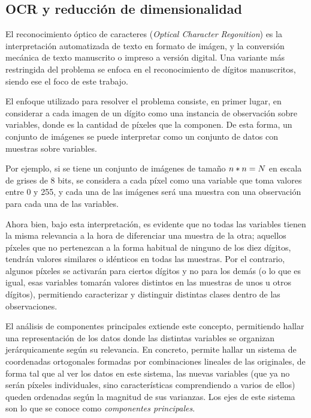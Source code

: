 \subsection{OCR y reducción de dimensionalidad}
\label{intro:ocr}

El reconocimiento óptico de caracteres (\emph{Optical Character Regonition}) es la interpretación automatizada de texto en formato de imágen, y la conversión mecánica de texto manuscrito o impreso a versión digital. Una variante más restringida del problema se enfoca en el reconocimiento de dígitos manuscritos, siendo ese el foco de este trabajo.

El enfoque utilizado para resolver el problema consiste, en primer lugar, en considerar a cada imagen de un dígito como una instancia de observación sobre \N variables, donde \N es la cantidad de píxeles que la componen. De esta forma, un conjunto de \M imágenes se puede interpretar como un conjunto de datos con \M muestras sobre \N variables.

Por ejemplo, si se tiene un conjunto de imágenes de tamaño $n * n = N$ en escala de grises de 8 bits, se considera a cada píxel como una variable que toma valores entre 0 y 255, y cada una de las imágenes será una muestra con una observación para cada una de las \N variables.

Ahora bien, bajo esta interpretación, es evidente que no todas las variables tienen la misma relevancia a la hora de diferenciar una muestra de la otra; aquellos píxeles que no pertenezcan a la forma habitual de ninguno de los diez dígitos, tendrán valores similares o idénticos en todas las muestras. Por el contrario, algunos píxeles se activarán para ciertos dígitos y no para los demás (o lo que es igual, esas variables tomarán valores distintos en las muestras de unos u otros  dígitos), permitiendo caracterizar y distinguir distintas clases dentro de las observaciones.

El análisis de componentes principales extiende este concepto, permitiendo hallar una representación de los datos donde las distintas variables se organizan jerárquicamente según su relevancia. En concreto, permite hallar un sistema de coordenadas ortogonales formadas por combinaciones lineales de las originales, de forma tal que al ver los datos en este sistema, las nuevas variables (que ya no serán píxeles individuales, sino características comprendiendo a varios de ellos) queden ordenadas según la magnitud de sus varianzas. Los ejes de este sistema son lo que se conoce como \emph{componentes principales}.


